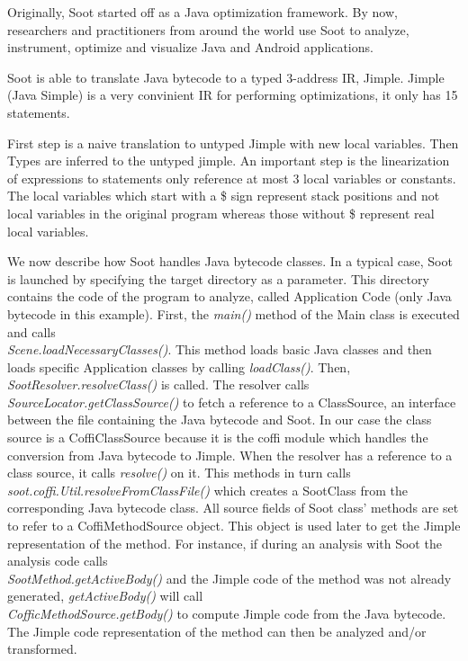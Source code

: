 \documentclass{dithesis}
\begin{document}
    Originally, Soot started off as a Java optimization framework. By now, researchers and 
    practitioners from around the world use Soot to analyze, instrument, optimize and 
    visualize Java and Android applications.
    \cite{Sable: Soot}
    
        Soot is able to translate Java bytecode to a typed 3-address IR, Jimple. Jimple (Java Simple) is a very convinient IR for performing optimizations, it only has 15 statements.

        First step is a naive translation to untyped Jimple with new local variables. Then Types are inferred to the untyped jimple. An important step is the linearization of expressions to statements only reference at most 3 local variables or constants. The local variables which start with a \$ sign represent stack positions and not local variables in the original program whereas those without \$ represent real local variables.
        
        We now describe how Soot handles Java bytecode classes. In a typical case, Soot is launched by specifying the target directory as a parameter. This directory contains the code of the program to analyze, called Application Code (only Java bytecode in this example). First, the \textit{main()} method of the Main class is executed and calls \\
        \textit{Scene.loadNecessaryClasses()}. This method loads basic Java classes and then loads specific Application classes by calling \textit{loadClass()}. Then, \textit{SootResolver.resolveClass()} is called. The resolver calls \\ 
        \textit{SourceLocator.getClassSource()} to fetch a reference to a ClassSource, an interface between the file containing the Java bytecode and Soot. In our case the class source is a CoffiClassSource because it is the coffi module which handles the conversion from Java bytecode to Jimple. When the resolver has a reference to a class source, it calls \textit{resolve()} on it. This methods in turn calls \\ \textit{soot.coffi.Util.resolveFromClassFile()} which creates a SootClass from the corresponding Java bytecode class. All source fields of Soot class’ methods are set to refer to a CoffiMethodSource object. This object is used later to get the Jimple representation of the method. For instance, if during an analysis with Soot the analysis code calls \\ \textit{SootMethod.getActiveBody()} and the Jimple code of the method was not already generated, \textit{getActiveBody()} will call \\ \textit{CofficMethodSource.getBody()} to compute Jimple code from the Java bytecode. The Jimple code representation of the method can then be analyzed and/or transformed.
\end{document}
